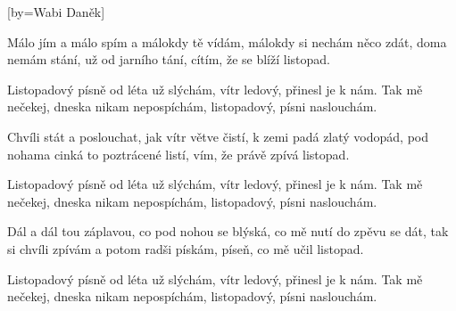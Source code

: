 [by={Wabi Daněk}]

\beginverse{}
Málo jím a málo spím a málokdy tě vídám,
málokdy si nechám něco zdát, 
doma nemám stání, už od jarního tání,
cítím, že se blíží listopad.
\endverse{}

\beginchorus{}
Listopadový písně od léta už slýchám,
vítr ledový, přinesl je k nám.
Tak mě nečekej, dneska nikam nepospíchám,
listopadový, písni naslouchám.
\endchorus{}

\beginverse*{}
   
\endverse{}

\beginverse{}
Chvíli stát a poslouchat, jak vítr větve čistí,
k zemi padá zlatý vodopád, 
pod nohama cinká to poztrácené listí,
vím, že právě zpívá listopad.
\endverse{}

\repeatingchorus{}
\beginchorus{}
Listopadový písně od léta už slýchám,
vítr ledový, přinesl je k nám.
Tak mě nečekej, dneska nikam nepospíchám,
listopadový, písni naslouchám.
\endchorus{}

\beginverse*{}
   
\endverse{}

\beginverse{}
Dál a dál tou záplavou, co pod nohou se blýská,
co mě nutí do zpěvu se dát, 
tak si chvíli zpívám a potom radši pískám,
píseň, co mě učil listopad.
\endverse{}

\repeatingchorus{}
\beginchorus{}
Listopadový písně od léta už slýchám,
vítr ledový, přinesl je k nám.
Tak mě nečekej, dneska nikam nepospíchám,
listopadový, písni naslouchám.
\endchorus{}

\beginverse*{}
   
\endverse{}

\endsong{}
